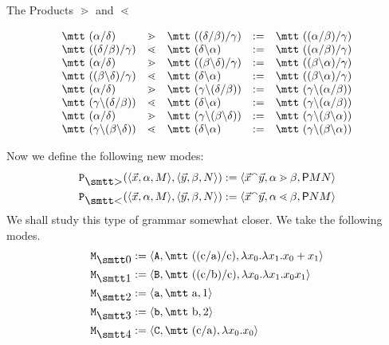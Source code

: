 \begin{table}
\caption{The Products $\gtrdot$ and $\lessdot$}
\label{tab:bullet}
$$\begin{array}{l@{\quad}c@{\quad}l@{\quad := \quad}l}
\mbox{\mtt ($\alpha$\tf$\delta$)} & \gtrdot
	 & \mbox{\mtt (($\delta$\tf$\beta$)\tf$\gamma$)} 
	& \mbox{\mtt (($\alpha$\tf$\beta$)\tf$\gamma$)} \\
\mbox{\mtt (($\delta$\tf$\beta$)\tf$\gamma$)} & \lessdot
	& \mbox{\mtt ($\delta$\tb$\alpha$)} 
        & \mbox{\mtt (($\alpha$\tf$\beta$)\tf$\gamma$)} \\
\mbox{\mtt ($\alpha$\tf$\delta$)} & \gtrdot
	& \mbox{\mtt (($\beta$\tb$\delta$)\tf$\gamma$)} 
        & \mbox{\mtt (($\beta$\tb$\alpha$)\tf$\gamma$)} \\
\mbox{\mtt (($\beta$\tb$\delta$)\tf$\gamma$)} & \lessdot
	& \mbox{\mtt ($\delta$\tb$\alpha$)}
        & \mbox{\mtt (($\beta$\tb$\alpha$)\tf$\gamma$)} \\
\mbox{\mtt ($\alpha$\tf$\delta$)} & \gtrdot
	& \mbox{\mtt ($\gamma${\tb}($\delta$\tf$\beta$))}
        & \mbox{\mtt ($\gamma${\tb}($\alpha$\tf$\beta$)}) \\
\mbox{\mtt ($\gamma${\tb}($\delta$\tf$\beta$))} & \lessdot
	& \mbox{\mtt ($\delta$\tb$\alpha$)}
        & \mbox{\mtt ($\gamma${\tb}($\alpha$\tf$\beta$))} \\
\mbox{\mtt ($\alpha$\tf$\delta$)}  & \gtrdot
	& \mbox{\mtt ($\gamma${\tb}($\beta$\tb$\delta$))}
        & \mbox{\mtt ($\gamma${\tb}($\beta$\tb$\alpha$))} \\
\mbox{\mtt ($\gamma${\tb}($\beta$\tb$\delta$))} & \lessdot
	& \mbox{\mtt ($\delta$\tb$\alpha$)}
        & \mbox{\mtt ($\gamma${\tb}($\beta$\tb$\alpha$))} 
\end{array}$$
\end{table}
Now we define the following new modes:
\begin{align}
\mbox{\tt P}_{\sgr}(\auf \vec{x},\alpha,M\zu,
\auf \vec{y},\beta,N\zu) & := 
\auf \vec{x}\conc\vec{y}, \alpha \gtrdot \beta, \mathsf{P}MN\zu \\
\mbox{\tt P}_{\skl}(\auf \vec{x},\alpha,M\zu,
\auf \vec{y},\beta,N\zu) & := 
\auf \vec{x}\conc\vec{y}, \alpha \lessdot \beta, \mathsf{P}NM\zu
\end{align}
We shall study this type of grammar somewhat closer. We take the
following modes.
\begin{align}
\notag
\mbox{\tt M}_{\snull} & := \auf \mbox{\tt A}, \mbox{\mtt ((c{\tf}a){\tf}c)}, 
	\lambda x_0.\lambda x_1.x_0+x_1\zu \\
\notag
\mbox{\tt M}_{\seins} & := \auf \mbox{\tt B},\mbox{\mtt ((c{\tf}b){\tf}c)}, 
	\lambda x_0.\lambda x_1.x_0x_1\zu \\
\mbox{\tt M}_{\szwei} & := \auf \mbox{\tt a}, \mbox{\mtt a}, 1\zu \\
\notag
\mbox{\tt M}_{\sdrei} & := \auf \mbox{\tt b}, \mbox{\mtt b}, 2\zu \\
\notag
\mbox{\tt M}_{\svier} & := \auf \mbox{\tt C}, \mbox{\mtt (c{\tf}a)}, 
	\lambda x_0.x_0\zu
\end{align}
